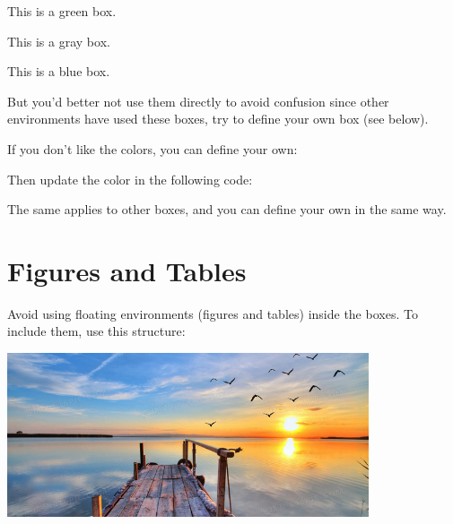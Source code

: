 \documentclass[11pt,a4paper]{article}
\begin{document}
\begin{greenbox}
    This is a green box.
    \end{greenbox}

\begin{graybox}
    This is a gray box.
    \end{graybox}

\begin{bluebox}
    This is a blue box.
  \end{bluebox}

{\color{blue} But you'd better not use them directly to avoid confusion since other environments have used these boxes, try to define your own box (see below).}

{\color{blue}If you don’t like the colors, you can define your own:}

\begin{tex}
\end{tex}

{\color{blue}Then update the color in the following code:}

\begin{tex}
\end{tex}

{\color{blue} The same applies to other boxes, and you can define your own in the same way.}

\section{Figures and Tables}

{\color{blue}Avoid using floating environments (figures and tables) inside the boxes. To include them, use this structure:}

\begin{tex}
    \begin{center}
        \includegraphics[width=0.8\textwidth]{image.jpeg}
    \end{center}
\end{tex}
\end{document}
